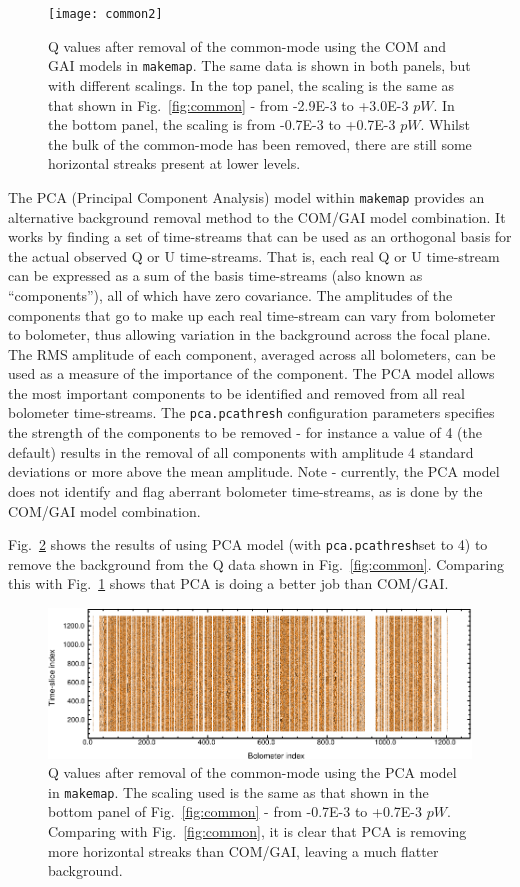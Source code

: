 \documentclass[twoside,11pt]{starlink}
\begin{document}
\begin{figure}
\texttt{[image: common2]}
\caption{Q values after removal of the common-mode using the COM and GAI
models in \texttt{makemap}. The same data is shown in both panels, but
with different scalings. In the top panel, the scaling is the same as
that shown in Fig.~\ref{fig:common} - from -2.9E-3 to +3.0E-3 $pW$. In the
bottom panel, the scaling is from -0.7E-3 to +0.7E-3 $pW$. Whilst the
bulk of the common-mode has been removed, there are still some horizontal
streaks present at lower levels.}
\label{fig:common2}
\end{figure}

The PCA (Principal Component Analysis) model within \texttt{makemap}
provides an alternative background removal method to the COM/GAI model
combination. It works by finding a set of time-streams that can be used
as an orthogonal basis for the actual observed Q or U time-streams. That
is, each real Q or U time-stream can be expressed as a sum of the basis
time-streams (also known as ``components''), all of which have zero
covariance. The amplitudes of the components that go to make up each real
time-stream can vary from bolometer to bolometer, thus allowing variation
in the background across the focal plane. The RMS amplitude of each
component, averaged across all bolometers, can be used as a measure of the
importance of the component. The PCA model allows the most important
components to be identified and removed from all real bolometer
time-streams.  The \texttt{pca.pcathresh} configuration parameters
specifies the strength of the components to be removed - for instance a
value of 4 (the default) results in the removal of all components with
amplitude 4 standard deviations or more above the mean amplitude. Note -
currently, the PCA model does not identify and flag aberrant bolometer
time-streams, as is done by the COM/GAI model combination.

Fig.~\ref{fig:pca1} shows the results of using PCA model (with
\texttt{pca.pcathresh}set to 4) to remove the background from the Q data
shown in Fig.~\ref{fig:common}. Comparing this with Fig.~\ref{fig:common2}
shows that PCA is doing a better job than COM/GAI.

\begin{figure}
\includegraphics[width=\columnwidth]{pca1}
\caption{Q values after removal of the common-mode using the PCA model
in \texttt{makemap}. The scaling used is the same as that shown in the
bottom panel of Fig.~\ref{fig:common} - from -0.7E-3 to +0.7E-3 $pW$.
Comparing with Fig.~\ref{fig:common}, it is clear that PCA is removing
more horizontal streaks than COM/GAI, leaving a much flatter background.}
\label{fig:pca1}
\end{figure}
\end{document}

